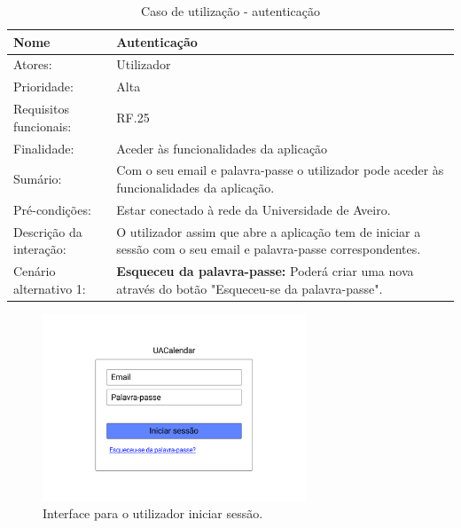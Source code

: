 \documentclass[11pt, twoside]{report}
\begin{document}
	
	\begin{table}[H]
		\caption{Caso de utilização - autenticação}
		\begin{center}	
			\begin{tabularx}{\textwidth}{|l|X|}
				\hline
				\textbf{Nome }              & \textbf{Autenticação}                                                                                             \\
				\hline
				Atores:                     & Utilizador                                                                                                          \\
				\hline
				Prioridade:                 & Alta                                                                                                                \\
				\hline
				Requisitos funcionais:      & RF.25                                                                                                               \\
				\hline
				Finalidade:                 & Aceder às funcionalidades da aplicação                                                                           \\
				\hline
				Sumário:                   & Com o seu email e palavra-passe o utilizador pode aceder às funcionalidades da aplicação.                        \\
				\hline
				Pré-condições:           & Estar conectado à rede da Universidade de Aveiro.                                                                  \\
				\hline
				Descrição da interação: & O utilizador assim que abre a aplicação tem de iniciar a sessão com o seu email e palavra-passe correspondentes. \\
				\hline
				Cenário alternativo 1:     & \textbf{Esqueceu da palavra-passe:} Poderá criar uma nova através do botão "Esqueceu-se da palavra-passe".       \\
				\hline
			\end{tabularx}
		\end{center}
	\end{table}
	
	\begin{figure}[H] 
		\centering 
		\includegraphics[width=0.7\textwidth,height=0.7\textheight,keepaspectratio]{image/prototipowireframes/autenticacao}
		\caption{Interface para o utilizador iniciar sessão.}
		\label{usecaseautenticacao}
	\end{figure}
	
\end{document}
